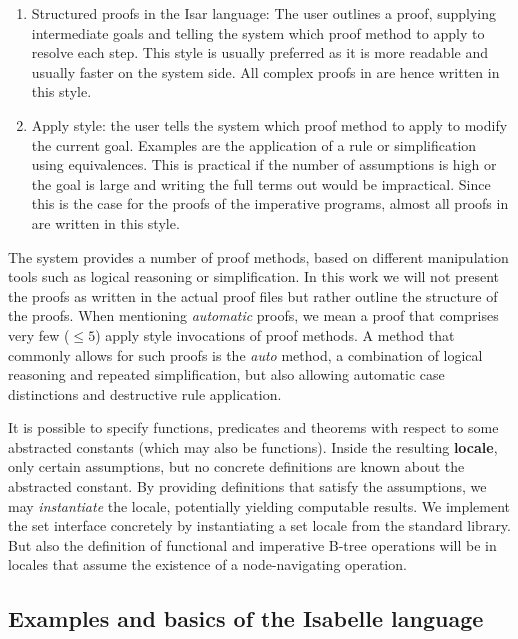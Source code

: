 \begin{enumerate}
    \item Structured proofs in the Isar language:
    The user outlines a proof, supplying intermediate goals
    and telling the system which proof method to apply to
    resolve each step.
    This style is usually preferred as it is more readable and usually
    faster on the system side.
    All complex proofs in  are hence written in this style.
    \item Apply style: the user tells the system which proof method
    to apply to modify the current goal.
    Examples are the application of a rule
    or simplification using equivalences.
    This is practical if the number of assumptions
    is high or the goal is large and writing the full terms
    out would be impractical.
    Since this is the case for the proofs of the imperative programs,
    almost all proofs in  are written in this style.
\end{enumerate}


The system provides a number of proof methods,
based on different manipulation tools
such as logical reasoning or simplification.
In this work we will not present the proofs as written in the actual
proof files but rather outline the structure of the proofs.
When mentioning \textit{automatic} proofs, we mean a proof that
comprises very few ($\le 5$) apply style
invocations of proof methods.
A method that commonly allows for such proofs is the \textit{auto} method,
a combination of logical reasoning and repeated simplification,
but also allowing automatic case distinctions and destructive rule application.

It is possible to specify functions, predicates
and theorems with respect to some abstracted constants
(which may also be functions).
Inside the resulting \textbf{locale}, only certain assumptions,
but no concrete definitions are known about the abstracted constant.
By providing definitions that satisfy
the assumptions, we may \textit{instantiate}
the locale, potentially yielding computable results.
We implement the set interface concretely by
instantiating a set locale from the standard library.
But also the definition of functional and imperative
B-tree operations will be in locales that assume
the existence of a node-navigating operation.

\subsection{Examples and basics of the Isabelle language}

